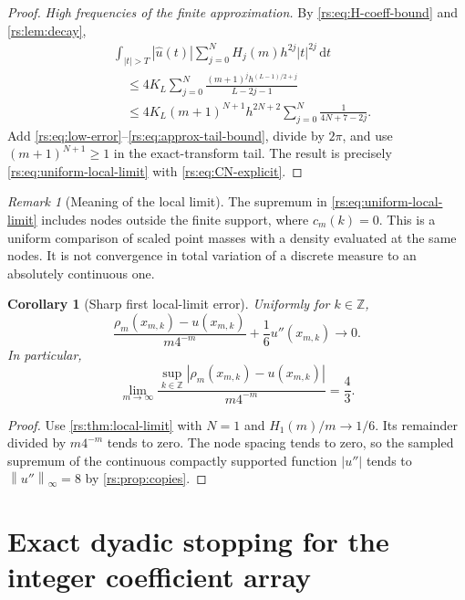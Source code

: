 \documentclass[11pt,a4paper,oneside,openany]{book}
\numberwithin{equation}{chapter}
\newtheorem{corollary}[theorem]{Corollary}
\theoremstyle{definition}
\theoremstyle{remark}
\newtheorem{remark}[theorem]{Remark}
\newcommand{\Z}{\mathbb Z}
\newcommand{\dd}{\,\mathrm d}
\newcommand{\norm}[1]{\left\lVert #1\right\rVert}
\begin{document}
\begin{proof}
\emph{High frequencies of the finite approximation.}
By \eqref{rs:eq:H-coeff-bound} and \cref{rs:lem:decay},
\begin{align}
 &\int_{|t|>T}|\widehat u(t)|\sum_{j=0}^NH_j(m)h^{2j}|t|^{2j}\dd t\nonumber\\
 &\quad\leq4K_L\sum_{j=0}^N
       \frac{(m+1)^jh^{(L-1)/2+j}}{L-2j-1}\nonumber\\
 &\quad\leq4K_L(m+1)^{N+1}h^{2N+2}
          \sum_{j=0}^N\frac1{4N+7-2j}.
 \label{rs:eq:approx-tail-bound}
\end{align}
Add \eqref{rs:eq:low-error}--\eqref{rs:eq:approx-tail-bound}, divide by
$2\pi$, and use $(m+1)^{N+1}\geq1$ in the exact-transform tail.
The result is precisely \eqref{rs:eq:uniform-local-limit} with
\eqref{rs:eq:CN-explicit}.
\end{proof}

\begin{remark}[Meaning of the local limit]
The supremum in \eqref{rs:eq:uniform-local-limit} includes nodes outside
the finite support, where $c_m(k)=0$. This is a uniform comparison
of scaled point masses with a density evaluated at the same nodes.
It is not convergence in total variation of a discrete measure to
an absolutely continuous one.
\end{remark}

\begin{corollary}[Sharp first local-limit error]\label{rs:cor:local-sharp}
Uniformly for $k\in\Z$,
\begin{equation}
 \frac{\rho_m(x_{m,k})-u(x_{m,k})}{m4^{-m}}
       +\frac16u''(x_{m,k})\longrightarrow0.
 \label{rs:eq:normalized-lattice-error}
\end{equation}
In particular,
\begin{equation}
 \lim_{m\to\infty}
 \frac{\sup_{k\in\Z}|\rho_m(x_{m,k})-u(x_{m,k})|}{m4^{-m}}
 =\frac43.
 \label{rs:eq:lattice-sharp-constant}
\end{equation}
\end{corollary}
\begin{proof}
Use \cref{rs:thm:local-limit} with $N=1$ and
$H_1(m)/m\to1/6$. Its remainder divided by $m4^{-m}$ tends to
zero. The node spacing tends to zero, so the sampled supremum of
the continuous compactly supported function $|u''|$ tends to
$\norm{u''}_\infty=8$ by \cref{rs:prop:copies}.
\end{proof}
\chapter{Exact dyadic stopping for the integer coefficient array}\label{rs:sec:dyadic-lattice}
\end{document}
